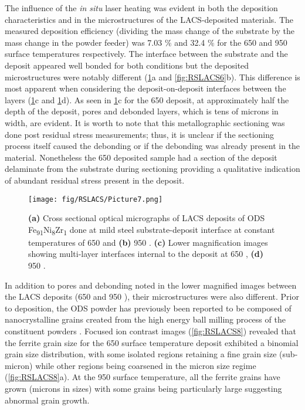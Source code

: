 	
		The influence of the \textit{in situ} laser heating was evident in both the deposition characteristics and in the microstructures of the LACS-deposited materials. The measured deposition efficiency (dividing the mass change of the substrate by the mass change in the powder feeder) was 7.03 $\%$  and 32.4 $\%$  for the 650 \celsius{} and 950 \celsius{} surface temperatures respectively. The interface between the substrate and the deposit appeared well bonded for both conditions but the deposited microstructures were notably different (\ref{fig:RSLACS7}a and \ref{fig:RSLACS6}b). This difference is most apparent when considering the deposit-on-deposit interfaces between the layers (\ref{fig:RSLACS7}c and \ref{fig:RSLACS7}d). As seen in \ref{fig:RSLACS7}c for the 650 \celsius{} deposit, at approximately half the depth of the deposit, pores and debonded layers, which is tens of microns in width, are evident. It is worth to note that this metallographic sectioning was done post residual stress measurements; thus, it is unclear if the sectioning process itself caused the debonding or if the debonding was already present in the material. Nonetheless the 650 \celsius{} deposited sample had a section of the deposit delaminate from the substrate during sectioning providing a qualitative indication of abundant residual stress present in the deposit. 
		
		
		
		\begin{figure}
			\centering
			\texttt{[image: fig/RSLACS/Picture7.png]}
			\caption[Cross sectional optical micrographs of LACS deposits of ODS Fe\textsubscript{91}Ni\textsubscript{8}Zr\textsubscript{1} done at mild steel substrate-deposit interface at constant temperatures of 650 \celsius{} and 950 \celsius{}.]{\textbf{(a)} Cross sectional optical micrographs of LACS deposits of ODS Fe\textsubscript{91}Ni\textsubscript{8}Zr\textsubscript{1} done at mild steel substrate-deposit interface at constant temperatures of 650 \celsius{} and \textbf{(b)} 950 \celsius{}. \textbf{(c)} Lower magnification images showing multi-layer interfaces internal to the deposit at\textbf{ }650 \celsius{}, \textbf{(d)} 950 \celsius{}.}
			\label{fig:RSLACS7}
		\end{figure}
		
		
		
		
		In addition to pores and debonding noted in the lower magnified images between the LACS deposits (650 \celsius{} and 950 \celsius{}), their microstructures were also different. Prior to deposition, the ODS powder has previously been reported to be composed of nanocrystalline grains created from the high energy ball milling process of the constituent powders \cite{RN243,RN291}. Focused ion contrast images (\ref{fig:RSLACS8}) revealed that the ferrite grain size for the 650 \celsius{} surface temperature deposit exhibited a binomial grain size distribution, with some isolated regions retaining a fine grain size (sub-micron) while other regions being coarsened in the micron size regime (\ref{fig:RSLACS8}a). At the 950 \celsius{} surface temperature, all the ferrite grains have grown (microns in sizes) with some grains being particularly large suggesting abnormal grain growth. 
		
